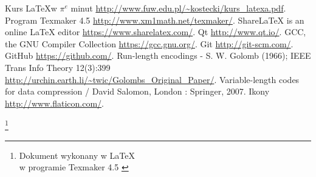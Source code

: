 \documentclass[12pt,a4paper,notitlepage]{report}
\newcommand\blfootnote[1]{%
  \begingroup
  \renewcommand\thefootnote{}\footnote{#1}%
  \addtocounter{footnote}{-1}%
  \endgroup
}
\begin{document}
\begin{thebibliography}{1}
	 Kurs \LaTeX w $\pi^e$ minut \url{http://www.fuw.edu.pl/~kostecki/kurs_latexa.pdf}.
	 Program Texmaker 4.5 \url{http://www.xm1math.net/texmaker/}.
	 ShareLaTeX is an online LaTeX editor \url{https://www.sharelatex.com/}.	
	 Qt \url{http://www.qt.io/}.
	 GCC, the GNU Compiler Collection \url{https://gcc.gnu.org/}.
	 Git \url{http://git-scm.com/}.
	 GitHub \url{https://github.com/}.
	 Run-length encodings - S. W. Golomb (1966); IEEE Trans Info Theory 12(3):399 \url{http://urchin.earth.li/~twic/Golombs_Original_Paper/}.
	 Variable-length codes for data compression / David Salomon, London : Springer, 2007.
	 Ikony \url{http://www.flaticon.com/}.
\end{thebibliography}

	\blfootnote{Dokument wykonany w \LaTeX \cite{latex} \\ w programie Texmaker 4.5 \cite{program}}	
\end{document}
